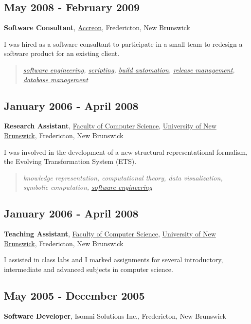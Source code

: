 \documentclass[11pt]{article}
\begin{document}
\subsection{May 2008 - February 2009}
\label{sec-2-4}

\textbf{Software Consultant}, \href{http://www.accreon.com}{Accreon}, Fredericton, New Brunswick

I was hired as a software consultant to participate in a small team to redesign a software product for an existing client.
\begin{quote}
\emph{\hyperref[sec-5-2]{software engineering}, \hyperref[scripting]{scripting}, \hyperref[automation]{build automation}, \hyperref[automation]{release management}, \hyperref[database-management]{database management}}
\end{quote}
\subsection{January 2006 - April 2008}
\label{sec-2-5}

\textbf{Research Assistant}, \href{http://www.cs.unb.ca}{Faculty of Computer Science}, \href{http://www.unb.ca}{University of New Brunswick}, Fredericton, New Brunswick

I was involved in the development of a new structural representational formalism, the Evolving Transformation System (ETS).
\begin{quote}
\emph{knowledge representation, computational theory, data visualization, symbolic computation, \hyperref[sec-5-2]{software engineering}}
\end{quote}
\subsection{January 2006 - April 2008}
\label{sec-2-6}

\textbf{Teaching Assistant}, \href{http://www.cs.unb.ca}{Faculty of Computer Science}, \href{http://www.unb.ca}{University of New Brunswick}, Fredericton, New Brunswick

I assisted in class labs and I marked assignments for several introductory, intermediate and advanced subjects in computer science.
\subsection{May 2005 - December 2005}
\label{sec-2-7}

\textbf{Software Developer}, Isomni Solutions Inc., Fredericton, New Brunswick
\end{document}
